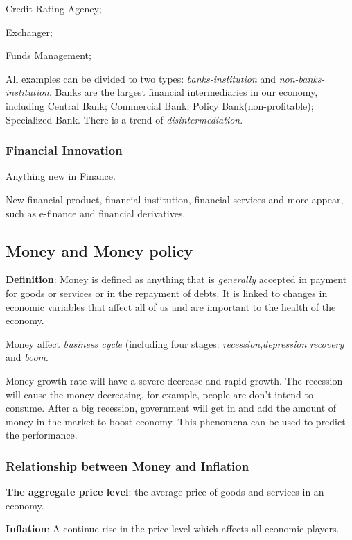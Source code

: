 \documentclass[10pt, a4paper]{article}
\begin{document}
            \quad Credit Rating Agency; 

            \quad Exchanger; 
            
            \quad Funds Management; 

        All examples can be divided to two types: \emph{banks-institution} and \emph{non-banks-institution}. Banks are the largest financial intermediaries in our economy, including Central Bank; Commercial Bank; Policy Bank(non-profitable); Specialized Bank. There is a trend of \emph{disintermediation}.
        
        \subsubsection{Financial Innovation}
            Anything new in Finance. 

            New financial product, financial institution, financial services and more appear, such as e-finance and financial derivatives. 
        \subsection{Money and Money policy}
            \textbf{Definition}: Money is defined as anything that is \emph{generally} accepted in payment for goods or services or in the repayment of debts. It is linked to changes in economic variables that affect all of us and are important to the health of the economy. 

            Money affect \emph{business cycle} (including four stages: \emph{recession},\emph{depression} \emph{recovery} and \emph{boom}. 

            Money growth rate will have a severe decrease and rapid growth. The recession will cause the money decreasing, for example, people are don't intend to consume. After a big recession, government will get in and add the amount of money in the market to boost economy. This phenomena can be used to  predict the performance.
            
            \subsubsection{Relationship between Money and Inflation} 
                \textbf{The aggregate price level}: the average price of goods and services in an economy. 
                
                \textbf{Inflation}: A continue rise in the price level which affects all economic players. 
\end{document}
